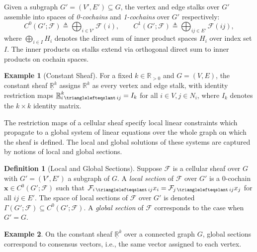 \documentclass[letterpaper, 10 pt, conference]{ieeeconf}
\newcommand{\R}{\mathbb{R}}
\newcommand{\define}[1]{\emph{#1}}
\newcommand{\FF}{\mathcal{F}}
\DeclareMathOperator{\face}{\trianglelefteqslant}
\theoremstyle{definition}
\newtheorem{definition}{Definition}
\newtheorem{example}{Example}
\begin{document}
Given a subgraph $G'=(V',E') \subseteq G$, the vertex and edge stalks over $G'$ assemble into spaces of \define{0-cochains} and \define{1-cochains} over $G'$ respectively:
\[
C^0(G';\FF)\triangleq \bigoplus_{i\in V'}\FF(i),\quad\quad C^1(G';\FF)\triangleq\bigoplus_{ij\in E'}\FF(ij),
\]
where $\bigoplus_{i\in I}H_i$ denotes the direct sum of inner product spaces $H_i$ over index set $I$.
The inner products on stalks extend via orthogonal direct sum to inner products on cochain spaces.

\begin{example}[Constant Sheaf]
    For a fixed $k\in\mathbb{R}_{>0}$ and $G=(V,E)$, the constant sheaf $\underline{\mathbb{R}}^k$ assigns $\R^k$ as every vertex and edge stalk, with identity restriction maps $\underline{\R}^k_{i\face ij} = I_{k}$ for all $i\in V, j\in N_i$, where $I_{k}$ denotes the $k\times k$ identity matrix.
\end{example}

The restriction maps of a cellular sheaf specify local linear constraints which propagate to a global system of linear equations over the whole graph on which the sheaf is defined. The local and global solutions of these systems are captured by notions of local and global sections.
\begin{definition}[Local and Global Sections]
    Suppose $\mathcal{F}$ is a cellular sheaf over $G$ with $G'=(V',E')$ a subgraph of $G$. 
    A \define{local section} of $\FF$ over $G'$ is a 0-cochain $\mathbf{x}\in C^0(G';\FF)$ such that $\FF_{i\face ij}x_i = \FF_{j\face ij}x_j$ for all $ij\in E'$.
    The space of local sections of $\FF$ over $G'$ is denoted $\Gamma(G';\FF)\subseteq C^0(G';\FF)$. A \define{global section} of $\FF$ corresponds to the case when $G'=G$.
\end{definition}

\begin{example}
    On the constant sheaf $\underline{\R}^k$ over a connected graph $G$, global sections correspond to consensus vectors, i.e., the same vector assigned to each vertex.
\end{example}
\end{document}
